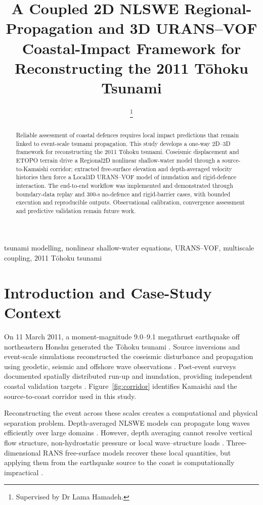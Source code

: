 \documentclass[10pt,conference,a4paper]{IEEEtran}
\title{A Coupled 2D NLSWE Regional-Propagation and 3D URANS--VOF Coastal-Impact Framework for Reconstructing the 2011 Tōhoku Tsunami}
\author{
  \IEEEauthorblockN{Rhyen Jivan}
  \IEEEauthorblockA{MEng Mechanical Engineering\\
  University College London\\
  London, United Kingdom}
  \thanks{Supervised by Dr Lama Hamadeh.}
}
\begin{document}
\maketitle

\begin{abstract}
Reliable assessment of coastal defences requires local impact predictions
that remain linked to event-scale tsunami propagation. This study develops a
one-way 2D--3D framework for reconstructing the 2011 Tōhoku tsunami.
Coseismic displacement and ETOPO terrain drive a Regional2D nonlinear
shallow-water model through a source-to-Kamaishi corridor; extracted
free-surface elevation and depth-averaged velocity histories then force a
Local3D URANS--VOF model of inundation and rigid-defence interaction. The
end-to-end workflow was implemented and demonstrated through boundary-data
replay and 300-s no-defence and rigid-barrier cases, with bounded execution
and reproducible outputs. Observational calibration, convergence assessment
and predictive validation remain future work.
\end{abstract}

\begin{IEEEkeywords}
tsunami modelling, nonlinear shallow-water equations, URANS--VOF,
multiscale coupling, 2011 Tōhoku tsunami
\end{IEEEkeywords}

\section{Introduction and Case-Study Context}

On 11 March 2011, a moment-magnitude 9.0--9.1 megathrust earthquake
off northeastern Honshu generated the Tōhoku tsunami
\cite{usgs2011tohokuEvent,hayes2011rapid,fujii2011tsunamisource}. Source
inversions and event-scale simulations reconstructed the coseismic disturbance
and propagation using geodetic, seismic and offshore wave observations
\cite{fujii2011tsunamisource,grilli2013tohoku,fine2013japan,wei2013japan}.
Post-event surveys documented spatially distributed run-up and inundation,
providing independent coastal validation targets \cite{mori2012nationwide}.
Figure~\ref{fig:corridor} identifies Kamaishi and the source-to-coast corridor
used in this study.

Reconstructing the event across these scales creates a computational and
physical separation problem. Depth-averaged NLSWE models can propagate long
waves efficiently over large domains
\cite{kurganov2007wellbalanced,dutykh2011volna}. However, depth averaging
cannot resolve vertical flow structure, non-hydrostatic pressure or local
wave--structure loads \cite{qin2018comparison}. Three-dimensional RANS
free-surface models recover these local quantities, but applying them from the
earthquake source to the coast is computationally impractical
\cite{hirt1981vof,higuera2013realistic,fujima2002hybrid}.
\end{document}
